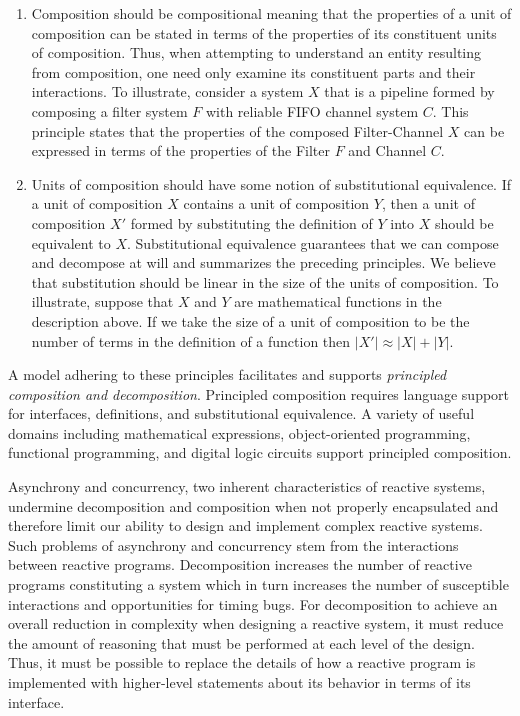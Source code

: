 \begin{enumerate}
\item Composition should be compositional meaning that the properties of a unit of composition can be stated in terms of the properties of its constituent units of composition.
Thus, when attempting to understand an entity resulting from composition, one need only examine its constituent parts and their interactions.
To illustrate, consider a system $X$ that is a pipeline formed by composing a filter system $F$ with reliable FIFO channel system $C$.
This principle states that the properties of the composed Filter-Channel $X$ can be expressed in terms of the properties of the Filter $F$ and Channel $C$.

\item Units of composition should have some notion of substitutional equivalence.
If a unit of composition $X$ contains a unit of composition $Y$, then a unit of composition $X'$ formed by substituting the definition of $Y$ into $X$ should be equivalent to $X$.
Substitutional equivalence guarantees that we can compose and decompose at will and summarizes the preceding principles.
We believe that substitution should be linear in the size of the units of composition.
To illustrate, suppose that $X$ and $Y$ are mathematical functions in the description above. %
If we take the size of a unit of composition to be the number of terms in the definition of a function then $|X'| \approx |X| + |Y|$.
\end{enumerate}
A model adhering to these principles facilitates and supports \emph{principled composition and decomposition}.
Principled composition requires language support for interfaces, definitions, and substitutional equivalence.
A variety of useful domains including mathematical expressions, object-oriented programming, functional programming, and digital logic circuits support principled composition.

Asynchrony and concurrency, two inherent characteristics of reactive systems, undermine decomposition and composition when not properly encapsulated and therefore limit our ability to design and implement complex reactive systems.
Such problems of asynchrony and concurrency stem from the interactions between reactive programs.
Decomposition increases the number of reactive programs constituting a system which in turn increases the number of susceptible interactions and opportunities for timing bugs.
For decomposition to achieve an overall reduction in complexity when designing a reactive system, it must reduce the amount of reasoning that must be performed at each level of the design.
Thus, it must be possible to replace the details of how a reactive program is implemented with higher-level statements about its behavior in terms of its interface.


